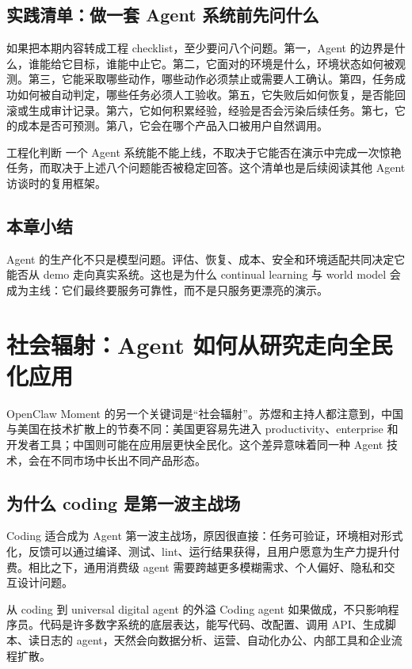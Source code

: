 \documentclass[a4paper]{article}
\begin{document}
\subsection{实践清单：做一套 Agent 系统前先问什么}

如果把本期内容转成工程 checklist，至少要问八个问题。第一，Agent 的边界是什么，谁能给它目标，谁能中止它。第二，它面对的环境是什么，环境状态如何被观测。第三，它能采取哪些动作，哪些动作必须禁止或需要人工确认。第四，任务成功如何被自动判定，哪些任务必须人工验收。第五，它失败后如何恢复，是否能回滚或生成审计记录。第六，它如何积累经验，经验是否会污染后续任务。第七，它的成本是否可预测。第八，它会在哪个产品入口被用户自然调用。

\begin{importantbox}{工程化判断}
一个 Agent 系统能不能上线，不取决于它能否在演示中完成一次惊艳任务，而取决于上述八个问题能否被稳定回答。这个清单也是后续阅读其他 Agent 访谈时的复用框架。
\end{importantbox}

\subsection{本章小结}

Agent 的生产化不只是模型问题。评估、恢复、成本、安全和环境适配共同决定它能否从 demo 走向真实系统。这也是为什么 continual learning 与 world model 会成为主线：它们最终要服务可靠性，而不是只服务更漂亮的演示。

\section{社会辐射：Agent 如何从研究走向全民化应用}

OpenClaw Moment 的另一个关键词是“社会辐射”。苏煜和主持人都注意到，中国与美国在技术扩散上的节奏不同：美国更容易先进入 productivity、enterprise 和开发者工具；中国则可能在应用层更快全民化。这个差异意味着同一种 Agent 技术，会在不同市场中长出不同产品形态。

\subsection{为什么 coding 是第一波主战场}

Coding 适合成为 Agent 第一波主战场，原因很直接：任务可验证，环境相对形式化，反馈可以通过编译、测试、lint、运行结果获得，且用户愿意为生产力提升付费。相比之下，通用消费级 agent 需要跨越更多模糊需求、个人偏好、隐私和交互设计问题。

\begin{knowledgebox}{从 coding 到 universal digital agent 的外溢}
Coding agent 如果做成，不只影响程序员。代码是许多数字系统的底层表达，能写代码、改配置、调用 API、生成脚本、读日志的 agent，天然会向数据分析、运营、自动化办公、内部工具和企业流程扩散。
\end{knowledgebox}
\end{document}
